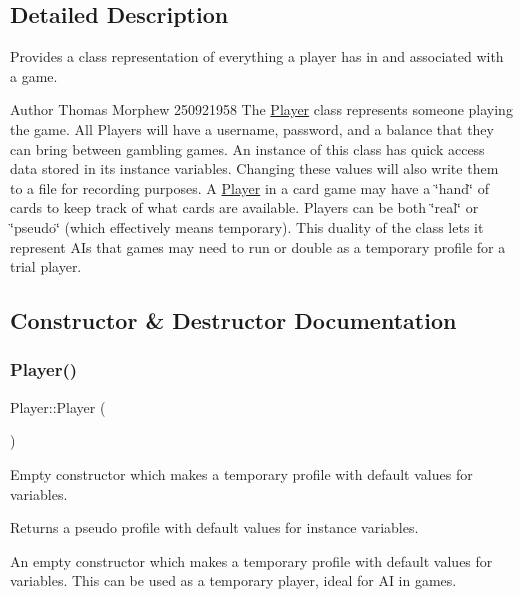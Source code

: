 \subsection{Detailed Description}
Provides a class representation of everything a player has in and associated with a game. 

\begin{DoxyAuthor}{Author}
Thomas Morphew 250921958 The \hyperlink{classPlayer}{Player} class represents someone playing the game. All Players will have a username, password, and a balance that they can bring between gambling games. An instance of this class has quick access data stored in its instance variables. Changing these values will also write them to a file for recording purposes. A \hyperlink{classPlayer}{Player} in a card game may have a \char`\"{}hand\char`\"{} of cards to keep track of what cards are available. Players can be both \char`\"{}real\char`\"{} or \char`\"{}pseudo\char`\"{} (which effectively means temporary). This duality of the class lets it represent AI\textquotesingle{}s that games may need to run or double as a temporary profile for a trial player. 
\end{DoxyAuthor}


\subsection{Constructor \& Destructor Documentation}
\mbox{\label{classPlayer_affe0cc3cb714f6deb4e62f0c0d3f1fd8}} 
\subsubsection{\texorpdfstring{Player()}{Player()}\hspace{0.1cm}{\footnotesize\ttfamily [1/2]}}
{\footnotesize\ttfamily Player\+::\+Player (\begin{DoxyParamCaption}{ }\end{DoxyParamCaption})}



Empty constructor which makes a temporary profile with default values for variables. 

\begin{DoxyReturn}{Returns}
a pseudo profile with default values for instance variables.
\end{DoxyReturn}
An empty constructor which makes a temporary profile with default values for variables. This can be used as a temporary player, ideal for AI in games. \mbox{\label{classPlayer_a61d2a5c3a5f6a6e4a408ba802337af51}} 
